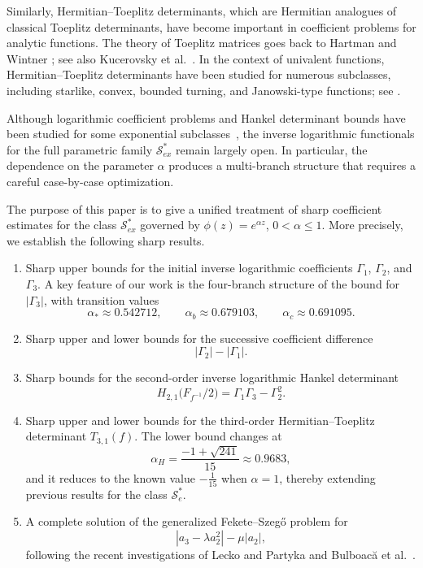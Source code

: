 \documentclass[11pt,reqno]{amsart}
\numberwithin{equation}{section}
\begin{document}
Similarly, Hermitian--Toeplitz determinants, which are Hermitian analogues of classical Toeplitz determinants, have become important in coefficient problems for analytic functions. The theory of Toeplitz matrices goes back to Hartman and Wintner \cite{HW}; see also Kucerovsky et al.\ \cite{KMS}. In the context of univalent functions, Hermitian--Toeplitz determinants have been studied for numerous subclasses, including starlike, convex, bounded turning, and Janowski-type functions; see \cite{Ali,C,K3,KKD2023,KPR,KumarCho2021,KSC,GJSS2023,TKBSKS2025,UFBCL2025}.

Although logarithmic coefficient problems and Hankel determinant bounds have been studied for some exponential subclasses~\cite{Panja2026}, the inverse logarithmic functionals for the full parametric family $\mathcal{S}_{ex}^{\ast}$ remain largely open. In particular, the dependence on the parameter $\alpha$ produces a multi-branch structure that requires a careful case-by-case optimization.

The purpose of this paper is to give a unified treatment of sharp coefficient estimates for the class $\mathcal{S}_{ex}^{\ast}$ governed by $\phi(z)=e^{\alpha z}$, $0<\alpha\le1$. More precisely, we establish the following sharp results.

\begin{enumerate}
\item Sharp upper bounds for the initial inverse logarithmic coefficients $\Gamma_1$, $\Gamma_2$, and $\Gamma_3$. A key feature of our work is the four-branch structure of the bound for $|\Gamma_3|$, with transition values
\[
\alpha_* \approx 0.542712,\qquad
\alpha_b \approx 0.679103,\qquad
\alpha_c \approx 0.691095.
\]

\item Sharp upper and lower bounds for the successive coefficient difference
\[
|\Gamma_2|-|\Gamma_1|.
\]

\item Sharp bounds for the second-order inverse logarithmic Hankel determinant
\[
H_{2,1}\bigl(F_{f^{-1}}/2\bigr)
=
\Gamma_1\Gamma_3-\Gamma_2^2.
\]

\item Sharp upper and lower bounds for the third-order Hermitian--Toeplitz determinant $T_{3,1}(f)$. The lower bound changes at
\[
\alpha_H = \frac{-1+\sqrt{241}}{15} \approx 0.9683,
\]
and it reduces to the known value $-\frac{1}{15}$ when $\alpha=1$, thereby extending previous results for the class $\mathcal{S}_e^*$.

\item A complete solution of the generalized Fekete--Szeg\H{o} problem for
\[
|a_3-\lambda a_2^2|-\mu|a_2|,
\]
following the recent investigations of Lecko and Partyka \cite{Lecko2024} and Bulboac\u{a} et al.\ \cite{Bulboaca2025}.
\end{enumerate}
\end{document}
